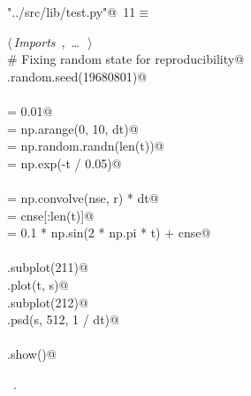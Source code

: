 \documentclass[12pt]{report}
\begin{document}
\begin{flushleft} \small\label{scrap1}\raggedright\small
{} \verb@"../src/lib/test.py"@\nobreak\ {\footnotesize {11}}$\equiv$
\vspace{-1ex}
\begin{list}{}{} \item
\mbox{}\verb@@\hbox{$\langle\,${\itshape Imports}\nobreak\ {\footnotesize {}, \ldots\ }$\,\rangle$}\verb@@\\
\mbox{}\verb@# Fixing random state for reproducibility@\\
\mbox{}\verb@np.random.seed(19680801)@\\
\mbox{}\verb@@\\
\mbox{}\verb@dt = 0.01@\\
\mbox{}\verb@t = np.arange(0, 10, dt)@\\
\mbox{}\verb@nse = np.random.randn(len(t))@\\
\mbox{}\verb@r = np.exp(-t / 0.05)@\\
\mbox{}\verb@@\\
\mbox{}\verb@cnse = np.convolve(nse, r) * dt@\\
\mbox{}\verb@cnse = cnse[:len(t)]@\\
\mbox{}\verb@s = 0.1 * np.sin(2 * np.pi * t) + cnse@\\
\mbox{}\verb@@\\
\mbox{}\verb@plt.subplot(211)@\\
\mbox{}\verb@plt.plot(t, s)@\\
\mbox{}\verb@plt.subplot(212)@\\
\mbox{}\verb@plt.psd(s, 512, 1 / dt)@\\
\mbox{}\verb@@\\
\mbox{}\verb@plt.show()@\\
\mbox{}\verb@@{\NWsep}
\end{list}
\vspace{-1.5ex}
\footnotesize
\begin{list}{}{\setlength{\itemsep}{-\parsep}\setlength{\itemindent}{-\leftmargin}}
\item \NWtxtFileDefBy\ .

\item{}
\end{list}
\vspace{4ex}
\end{flushleft}
\newchunk 
\end{document}
